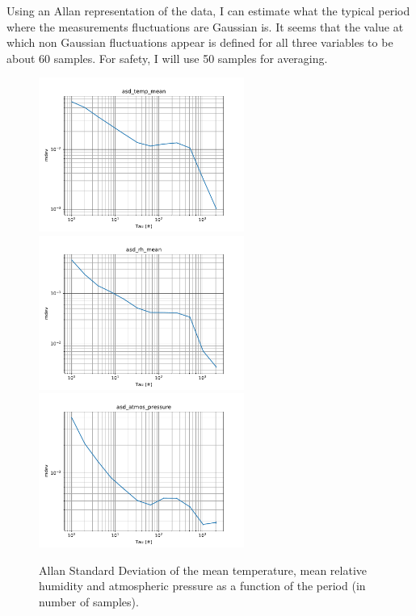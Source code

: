 \documentclass[11pt]{amsart}
\begin{document}
Using an Allan representation of the data, I can estimate what the typical period where the measurements fluctuations are Gaussian is.
It seems that the value at which non Gaussian fluctuations appear is defined for all three variables to be about 60 samples.
For safety, I will use 50 samples for averaging.

\begin{figure}
\includegraphics[width=0.6\textwidth]{../plots/asd_temp_mean.pdf}
\includegraphics[width=0.6\textwidth]{../plots/asd_rh_mean.pdf}
\includegraphics[width=0.6\textwidth]{../plots/asd_atmos_pressure.pdf}
\caption{Allan Standard Deviation of the mean temperature, mean relative humidity and atmospheric pressure as a function of the period (in number of samples).}
\end{figure}
\end{document}
